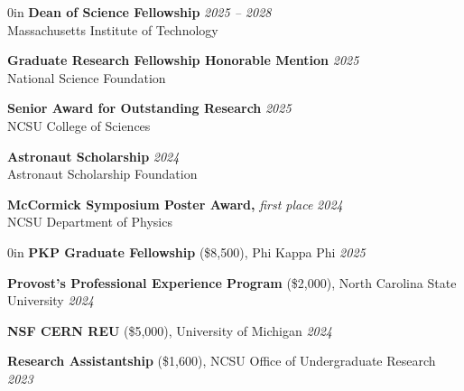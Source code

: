 \documentclass{cv}
\begin{document}
\begin{adjustwidth}{\spacing}{0in}
    \textbf{Dean of Science Fellowship}
    \hfill{\textsl{2025 -- 2028}}\\
    \tabto{\spacing} Massachusetts Institute of Technology
    \vspace{0.3em}

    \textbf{Graduate Research Fellowship Honorable Mention}
    \hfill{\textsl{2025}}\\
    \tabto{\spacing} National Science Foundation
    \vspace{0.3em}

    \textbf{Senior Award for Outstanding Research}
    \hfill{\textsl{2025}}\\
    \tabto{\spacing} NCSU College of Sciences
    \vspace{0.3em}

    \textbf{Astronaut Scholarship}
    \hfill{\textsl{2024}}\\
    \tabto{\spacing} Astronaut Scholarship Foundation
    \vspace{0.3em}

    \textbf{McCormick Symposium Poster Award,}
    \textit{first place}
    \hfill{\textsl{2024}}\\
    \tabto{\spacing} NCSU Department of Physics
\end{adjustwidth}
\vspace{0.6em}


\begin{adjustwidth}{\spacing}{0in}
    \textbf{PKP Graduate Fellowship} (\$8,500),
    Phi Kappa Phi
    \hfill \textsl{2025}

    \textbf{Provost's Professional Experience Program} (\$2,000),
    North Carolina State University
    \hfill \textsl{2024}

    \textbf{NSF CERN REU} (\$5,000),
    University of Michigan
    \hfill \textsl{2024}

    \textbf{Research Assistantship} (\$1,600),
    NCSU Office of Undergraduate Research
    \hfill \textsl{2023}
\end{adjustwidth}
\vspace{0.6em}


\vspace{0.2em}

\vspace{0.6em}

\end{document}
